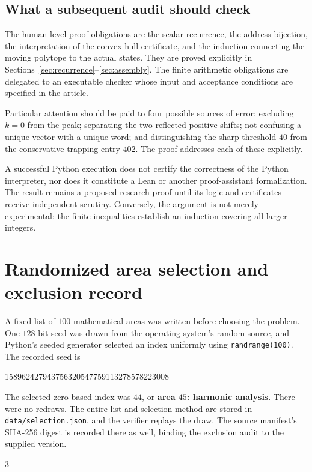 \documentclass[11pt,a4paper]{article}
\theoremstyle{definition}\newtheorem{definition}[theorem]{Definition}
\theoremstyle{remark}\newtheorem{remark}[theorem]{Remark}
\begin{document}
\subsection{What a subsequent audit should check}
The human-level proof obligations are the scalar recurrence, the address
bijection, the interpretation of the convex-hull certificate, and the
induction connecting the moving polytope to the actual states. They are proved
explicitly in Sections~\ref{sec:recurrence}--\ref{sec:assembly}.
The finite arithmetic obligations are delegated to an executable checker
whose input and acceptance conditions are specified in the article.

Particular attention should be paid to four possible sources of error:
excluding $k=0$ from the peak; separating the two reflected positive shifts;
not confusing a unique vector with a unique word; and distinguishing the
sharp threshold $40$ from the conservative trapping entry $402$.
The proof addresses each of these explicitly.

A successful Python execution does not certify the correctness of the Python
interpreter, nor does it constitute a Lean or another proof-assistant
formalization. The result remains a proposed research proof until its logic
and certificates receive independent scrutiny. Conversely, the argument is
not merely experimental: the finite inequalities establish an induction
covering all larger integers.

\clearpage
\appendix
\section{Randomized area selection and exclusion record}
\label{app:draw}

A fixed list of $100$ mathematical areas was written before choosing the
problem. One $128$-bit seed was drawn from the operating system's random
source, and Python's seeded generator selected an index uniformly using
\texttt{randrange(100)}. The recorded seed is
\begin{center}\ttfamily\small
158962427943756320547759113278578223008
\end{center}
The selected zero-based index was $44$, or \textbf{area $45$: harmonic
analysis}. There were no redraws. The entire list and selection method are
stored in \texttt{data/selection.json}, and the verifier replays the draw.
The source manifest's SHA-256 digest is recorded there as well, binding the
exclusion audit to the supplied version.

\begin{multicols}{3}
\footnotesize
\begin{enumerate}[leftmargin=2.2em,itemsep=0.12em,parsep=0pt]

\end{enumerate}
\end{multicols}
\end{document}
